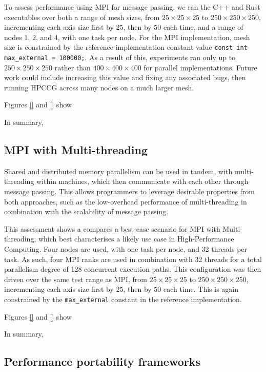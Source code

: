 To assess performance using MPI for message passing, we ran the C++ and Rust executables over both a range of mesh sizes, from $25 \times 25 \times 25$ to $250 \times 250 \times 250$, incrementing each axis size first by $25$, then by $50$ each time, and a range of nodes $1$, $2$, and $4$, with one task per node. For the MPI implementation, mesh size is constrained by the reference implementation constant value \texttt{const int max_external = 100000;}. As a result of this, experiments ran only up to $250 \times 250 \times 250$ rather than $400 \times 400 \times 400$ for parallel implementations. Future work could include increasing this value and fixing any associated bugs, then running HPCCG across many nodes on a much larger mesh. 

Figures \ref{} and \ref{} show 


In summary,

\subsection{MPI with Multi-threading}
\label{ssec:mpi-multithreading}

Shared and distributed memory parallelism can be used in tandem, with multi-threading within machines, which then communicate with each other through message passing. This allows programmers to leverage desirable properties from both approaches, such as the low-overhead performance of multi-threading in combination with the scalability of message passing.

This assessment shows a compares a best-case scenario for MPI with Multi-threading, which best characterises a likely use case in High-Performance Computing. Four nodes are used, with one task per node, and 32 threads per task. As such, four MPI ranks are used in combination with 32 threads for a total parallelism degree of 128 concurrent execution paths. This configuration was then driven over the same test range as MPI, from $25 \times 25 \times 25$ to $250 \times 250 \times 250$, incrementing each axis size first by $25$, then by $50$ each time. This is again constrained by the \texttt{max\_external} constant in the reference implementation.

Figures \ref{} and \ref{} show 


In summary,


\subsection{Performance portability frameworks}
\label{ssec:performance-portability-frameworks}

